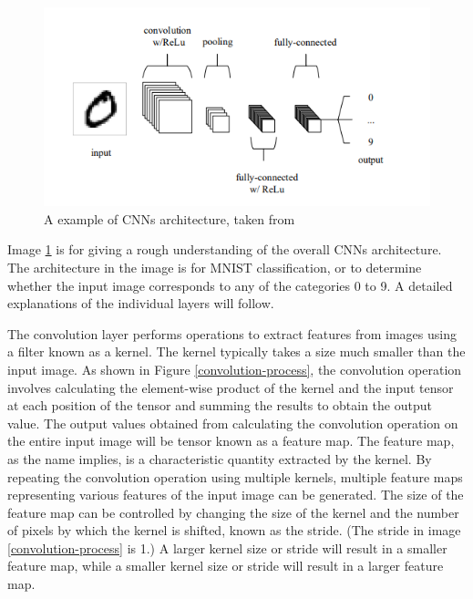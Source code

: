 \begin{figure}[h]
  \centering
  \includegraphics[width=135truemm]{resources/2_background/ex-CNN.png}
  \caption{
    A example of CNNs architecture,
    taken from \cite{o2015introduction}
  }
  \label{example-of-CNN}
\end{figure}
Image \ref{example-of-CNN} is for giving a rough understanding of the overall 
CNNs architecture.
The architecture in the image is for MNIST \cite{deng2012mnist} classification, 
or to determine whether the input image corresponds to any of the categories 
0 to 9. A detailed explanations of the individual layers will follow.

The convolution layer performs operations to extract features from images using 
a filter known as a kernel.
The kernel typically takes a size much smaller than the input image. 
As shown in Figure \ref{convolution-process}, the convolution operation involves calculating the 
element-wise product of the kernel and the input tensor at each position of 
the tensor and summing the results to obtain the output value. 
The output values obtained from calculating the convolution operation on the 
entire input image will be tensor known as a feature map.
The feature map, as the name implies, is a characteristic quantity 
extracted by the kernel. By repeating the convolution operation using multiple
kernels, multiple feature maps representing various features of the input 
image can be generated. 
The size of the feature map can be controlled by changing  the size of the kernel and the number 
of pixels by which the kernel is shifted, known as the stride. 
(The stride in image \ref{convolution-process} is 1.)
A larger kernel size or stride will result in a smaller feature map, 
while a smaller kernel size or stride will result in a larger feature map.


